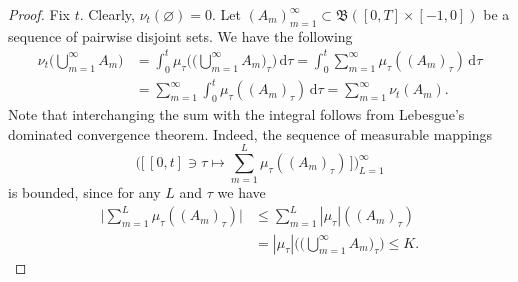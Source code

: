 \documentclass[reqno]{amsart}
\theoremstyle{plain}
\numberwithin{equation}{section}
\numberwithin{definition}{section}
\newcommand{\dd}{\ensuremath{\mathrm{d}}}
\begin{document}
\begin{proof}
 Fix $t$. Clearly, $\nu_t(\varnothing)=0$. Let $(A_m)_{m=1}^{\infty}\subset \mathfrak{B}([0,T]\times [-1,0])$ be a sequence of pairwise disjoint sets. We have the following 
    \begin{align*}
          \nu_t\Big(\bigcup_{m=1}^{\infty} A_m \Big) & = \int_0^t \mu_{\tau} \Big( \Big(\bigcup_{m=1}^{\infty} A_m\Big)_{\tau} \Big) \,\dd \tau  
           = \int_0^t \sum_{m=1}^{\infty} \mu_{\tau}( (A_m)_{\tau}) \,\dd \tau  \\
          & =  \sum_{m=1}^{\infty} \int_0^t \mu_{\tau}( (A_m)_{\tau}) \,\dd \tau  
           =  \sum_{m=1}^{\infty}   \nu_t( A_m).    
    \end{align*}
Note that interchanging the sum with the integral follows from Lebesgue's dominated convergence theorem. Indeed, the sequence of measurable mappings 
\begin{equation*}
    \Big(\Big[\,[0,t]\ni\tau\mapsto\sum_{m=1}^{L}\mu_{\tau} ( (A_m)_{\tau}) \,\Big]\Big)_{L=1}^{\infty}
\end{equation*}
is bounded, since for any $L$ and $\tau$ we have  
\begin{align*}
   \Big| \sum_{m=1}^{L}\mu_{\tau} ( (A_m)_{\tau}) \Big| & \le \sum_{m=1}^{L} | \mu_{\tau} | ( (A_m)_{\tau}) \\
   & = | \mu_{\tau}| \Big( \Big( \bigcup_{m=1}^{\infty} A_m\Big)_{\tau}\Big) 
      \le K.
\end{align*}
\end{proof}
\end{document}
